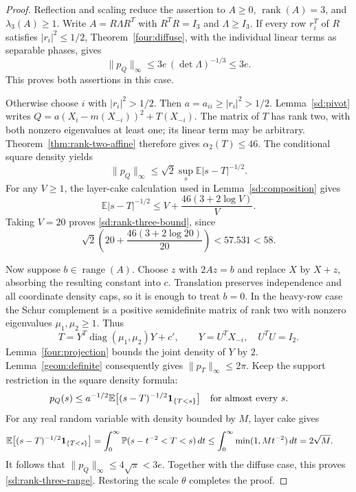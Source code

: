 \begin{proof}
Reflection and scaling reduce the assertion to $A\geq0$,
$\operatorname{rank}(A)=3$, and $\lambda_3(A)\geq1$.
Write $A=R\Lambda R^T$ with $R^TR=I_3$ and $\Lambda\geq I_3$.
If every row $r_i^T$ of $R$ satisfies $|r_i|^2\leq1/2$,
Theorem~\ref{four:diffuse}, with the individual linear terms as
separable phases, gives
\[
 \|p_Q\|_\infty\leq3e\,(\det\Lambda)^{-1/3}\leq3e.
 \tag*{}
\]
This proves both assertions in this case.

Otherwise choose $i$ with $|r_i|^2>1/2$.  Then
$a=a_{ii}\geq|r_i|^2>1/2$.
Lemma~\ref{sd:pivot} writes
$Q=a(X_i-m(X_{-i}))^2+T(X_{-i})$.
The matrix of $T$ has rank two, with both nonzero eigenvalues
at least one; its linear term may be arbitrary.
Theorem~\ref{thm:rank-two-affine} therefore gives
$\alpha_2(T)\leq46$.  The conditional square density yields
\[
 \|p_Q\|_\infty
 \leq \sqrt2\sup_s\mathbb E|s-T|^{-1/2}.
 \tag*{}
\]
For any $V\geq1$, the layer-cake calculation used in
Lemma~\ref{sd:composition} gives
\[
 \mathbb E|s-T|^{-1/2}
 \leq V+\frac{46(3+2\log V)}{V}.
 \tag*{}
\]
Taking $V=20$ proves \eqref{sd:rank-three-bound}, since
\[
 \sqrt2\left(20+\frac{46(3+2\log20)}{20}\right)
 <57.531<58.
 \tag*{}
\]

Now suppose $b\in\operatorname{range}(A)$.  Choose $z$ with
$2Az=b$ and replace $X$ by $X+z$, absorbing the resulting
constant into $c$.  Translation preserves independence and all
coordinate density caps, so it is enough to treat $b=0$.
In the heavy-row case the Schur complement is a positive
semidefinite matrix of rank two with nonzero eigenvalues
$\mu_1,\mu_2\geq1$.  Thus
\[
 T=Y^T\operatorname{diag}(\mu_1,\mu_2)Y+c',
 \qquad Y=U^TX_{-i},\quad U^TU=I_2.
 \tag*{}
\]
Lemma~\ref{four:projection} bounds the joint density of $Y$ by
$2$.  Lemma~\ref{geom:definite} consequently gives
$\|p_T\|_\infty\leq2\pi$.
Keep the support restriction in the square density formula:
\[
 p_Q(s)\leq a^{-1/2}
      \mathbb E\bigl[(s-T)^{-1/2}{\bf1}_{\{T<s\}}\bigr]
 \quad\hbox{for almost every }s.
 \tag*{}
\]
For any real random variable with density bounded by $M$,
layer cake gives
\[
 \mathbb E\bigl[(s-T)^{-1/2}{\bf1}_{\{T<s\}}\bigr]
 =\int_0^\infty\mathbb P(s-t^{-2}<T<s)\,dt
 \leq\int_0^\infty\min(1,Mt^{-2})\,dt=2\sqrt M.
 \tag*{}
\]
It follows that $\|p_Q\|_\infty\leq4\sqrt\pi<3e$.
Together with the diffuse case, this proves
\eqref{sd:rank-three-range}.  Restoring the scale $\theta$
completes the proof.
\end{proof}
